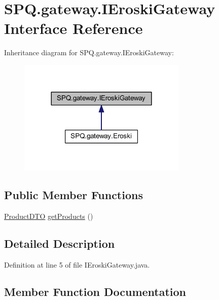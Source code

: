 \hypertarget{interface_s_p_q_1_1gateway_1_1_i_eroski_gateway}{}\section{S\+P\+Q.\+gateway.\+I\+Eroski\+Gateway Interface Reference}
\label{interface_s_p_q_1_1gateway_1_1_i_eroski_gateway}


Inheritance diagram for S\+P\+Q.\+gateway.\+I\+Eroski\+Gateway\+:
\nopagebreak
\begin{figure}[H]
\begin{center}
\leavevmode
\includegraphics[width=228pt]{interface_s_p_q_1_1gateway_1_1_i_eroski_gateway__inherit__graph}
\end{center}
\end{figure}
\subsection*{Public Member Functions}
\begin{DoxyCompactItemize}
\item 
\mbox{\hyperlink{class_s_p_q_1_1dto_1_1_product_d_t_o}{Product\+D\+TO}} \mbox{\hyperlink{interface_s_p_q_1_1gateway_1_1_i_eroski_gateway_a6263f66378bc39296c6ea003642d79b9}{get\+Products}} ()
\end{DoxyCompactItemize}


\subsection{Detailed Description}


Definition at line 5 of file I\+Eroski\+Gateway.\+java.



\subsection{Member Function Documentation}
\mbox{\label{interface_s_p_q_1_1gateway_1_1_i_eroski_gateway_a6263f66378bc39296c6ea003642d79b9}} 
